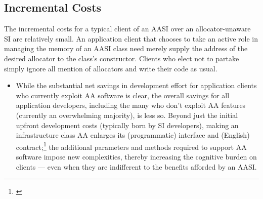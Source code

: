 \subsection{Incremental Costs}
The incremental costs for a typical client of an AASI over an allocator-unaware SI are
relatively small. An application client that chooses to take an active role in managing
the memory of an AASI class need merely supply the address of the desired allocator
to the class’s constructor. Clients who elect not to partake simply ignore all mention
of allocators and write their code as usual.

\begin{itemize}
\item While the substantial net savings in development effort for application clients
who currently exploit AA software is clear, the overall savings for all
application developers, including the many who don’t exploit AA features
(currently an overwhelming majority), is less so. Beyond just the initial
upfront development costs (typically born by SI developers), making an
infrastructure class AA enlarges its (programmatic) interface and (English)
contract;\footnote{\cite{khlebnikov19}} the additional parameters and methods required to support AA
software impose new complexities, thereby increasing the cognitive burden on
clients — even when they are indifferent to the benefits afforded by an AASI.


\end{itemize}
